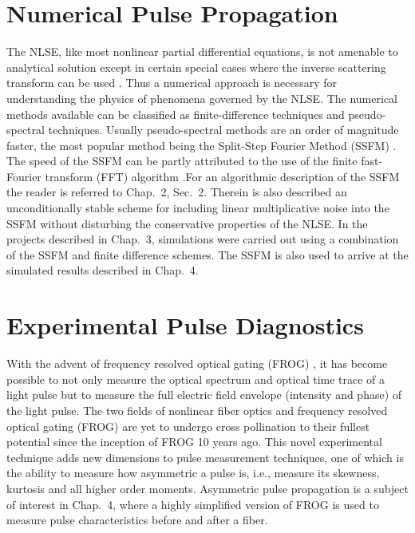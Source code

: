 \section{Numerical Pulse Propagation}

The NLSE, like most nonlinear partial differential equations, is not
amenable to analytical solution except in certain special cases where the
inverse scattering transform can be used \cite{Zakharov}. Thus a
numerical approach is necessary for understanding the physics of phenomena
governed by the NLSE. The numerical methods available can be classified as
finite-difference techniques and pseudo-spectral techniques. Usually
pseudo-spectral methods are an order of magnitude faster, the most
popular method being the Split-Step Fourier Method (SSFM) \cite{Agrawal2,Hardin,
Fisher}. The speed of the SSFM can be partly attributed to the use
of the finite fast-Fourier transform (FFT) algorithm
\cite{Cooley}.For an algorithmic description of the SSFM the reader is
referred to Chap.\ 2, Sec.\ 2. Therein is also described an
unconditionally stable scheme for including linear multiplicative noise into
the SSFM without disturbing the conservative properties of the NLSE. In the
projects described in Chap.\ 3, simulations were carried out using a
combination of the SSFM and finite difference schemes. The SSFM is also used
 to arrive at the simulated results described in Chap.\ 4.

\section{Experimental Pulse Diagnostics}

With the advent of frequency resolved optical gating
(FROG) \cite{Trebino,Kanejqe,Kaneoptlett}, it has become possible to not
only measure the optical spectrum and optical time trace of a light pulse
but to measure the full electric field envelope (intensity and phase) of the
light pulse. The two fields of nonlinear fiber optics and frequency resolved
optical gating (FROG) are yet to undergo cross pollination to their fullest
potential since the inception of FROG 10 years ago. This novel experimental
technique adds new dimensions to pulse measurement techniques, one of which
is the ability to measure how asymmetric a pulse is, i.e., measure its
skewness, kurtosis and all higher order moments. Asymmetric pulse
propagation is a subject of interest in Chap.\ 4, where a highly simplified
version of FROG \cite{OShealett} is used to measure pulse characteristics
before and after a fiber.

